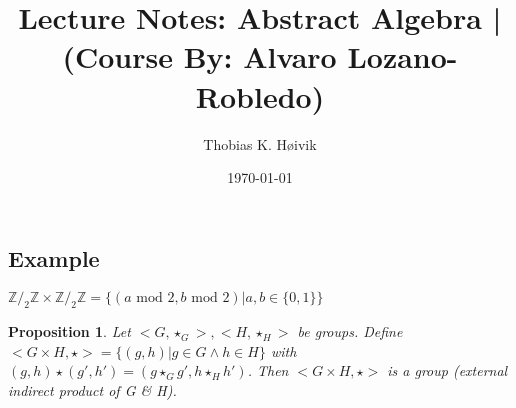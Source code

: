 \documentclass[12pt]{article}
\title{Lecture Notes: Abstract Algebra | (Course By: Alvaro Lozano-Robledo)}
\author{Thobias K. Høivik}
\date{\today}
\newtheorem{proposition}{Proposition}
\begin{document}
\maketitle
\subsection*{Example}
\(\mathbb Z/_2 \mathbb Z \times \mathbb Z/_2 \mathbb Z 
= \{(a \text{ mod } 2, b \text{ mod } 2) | a,b \in \{0,1\}\}\)

\begin{proposition}
    Let \(<G, \star_G>, <H, \star_H>\) be groups. 
    Define \(<G\times H, \star> = \{(g, h) | g\in G \land h \in H\}\) with 
    \((g, h) \star (g', h') = (g \star_G g', h \star_H h')\). 
    Then  \(<G\times H, \star>\) is a group (external indirect product of G \& H).
\end{proposition}
\end{document}
